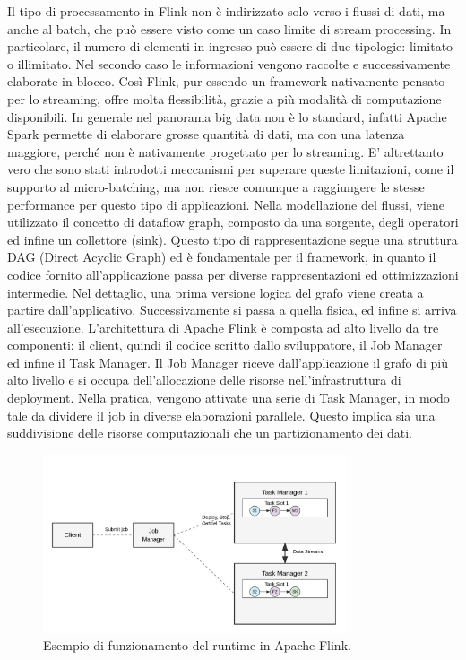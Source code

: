 Il tipo di processamento in Flink non è indirizzato solo verso i flussi di dati, ma anche al batch, che può essere visto come un caso limite di stream processing. In particolare, il numero di elementi in ingresso può essere di due tipologie: limitato o illimitato. Nel secondo caso le informazioni vengono raccolte e successivamente elaborate in blocco. Così Flink, pur essendo un framework nativamente pensato per lo streaming, offre molta flessibilità, grazie a più modalità di computazione disponibili. In generale nel panorama big data non è lo standard, infatti Apache Spark permette di elaborare grosse quantità di dati, ma con una latenza maggiore, perché non è nativamente progettato per lo streaming. E' altrettanto vero che sono stati introdotti meccanismi per superare queste limitazioni, come il supporto al micro-batching, ma non riesce comunque a raggiungere le stesse performance per questo tipo di applicazioni. Nella modellazione del flussi, viene utilizzato il concetto di dataflow graph, composto da una sorgente, degli operatori ed infine un collettore (sink). Questo tipo di rappresentazione segue una struttura DAG (Direct Acyclic Graph) ed è fondamentale per il framework, in quanto il codice fornito all'applicazione passa per diverse rappresentazioni ed ottimizzazioni intermedie. Nel dettaglio, una prima versione logica del grafo viene creata a partire dall'applicativo. Successivamente si passa a quella fisica, ed infine si arriva all'esecuzione. L'architettura di Apache Flink è composta ad alto livello da tre componenti: il client, quindi il codice scritto dallo sviluppatore, il Job Manager ed infine il Task Manager.  Il Job Manager riceve dall'applicazione il grafo di più alto livello e si occupa dell'allocazione delle risorse nell'infrastruttura di deployment. Nella pratica, vengono attivate una serie di Task Manager, in modo tale da dividere il job in diverse elaborazioni parallele. Questo implica sia una suddivisione delle risorse computazionali che un partizionamento dei dati. 

\begin{figure}[htbp]
    \centering
    \includegraphics[width=0.8\textwidth]{figures/flink-architecture-simple-final.png}
    \caption{Esempio di funzionamento del runtime in Apache Flink.}
    \label{fig:flink-arch}
\end{figure}

